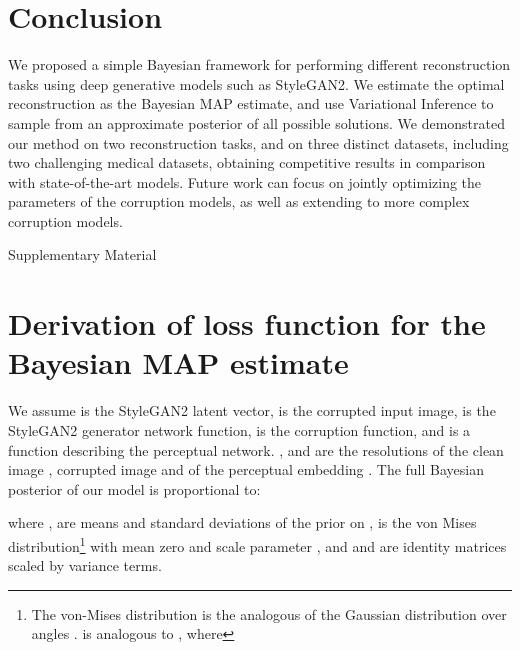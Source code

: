 \documentclass{article}
\begin{document}
\section{Conclusion}

We proposed a simple Bayesian framework for performing different reconstruction tasks using deep generative models such as StyleGAN2. We estimate the optimal reconstruction as the Bayesian MAP estimate, and use Variational Inference to sample from an approximate posterior of all possible solutions. We demonstrated our method on two reconstruction tasks, and on three distinct datasets, including two challenging medical datasets, obtaining competitive results in comparison with state-of-the-art models. Future work can focus on jointly optimizing the parameters of the corruption models, as well as extending to more complex corruption models.





{
\small





}








\pagebreak

\appendix

\begin{center}
\Large{Supplementary Material} 
\end{center}



\section{Derivation of loss function for the Bayesian MAP estimate}
\label{supderiv}


We assume  is the StyleGAN2 latent vector,  is the corrupted input image,  is the StyleGAN2 generator network function,  is the corruption function, and  is a function describing the perceptual network. ,  and  are the resolutions of the clean image , corrupted image  and of the perceptual embedding . The full Bayesian posterior  of our model is proportional to:



where ,  are means and standard deviations of the prior on ,  is the von Mises distribution\footnote{The von-Mises distribution is the analogous of the Gaussian distribution over angles .  is analogous to , where } with mean zero and scale parameter , and  and  are identity matrices scaled by variance terms. 
\end{document}
